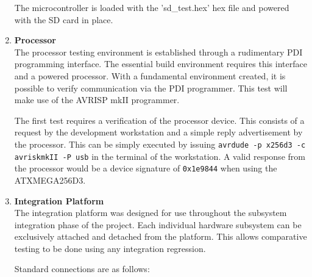 \documentclass[bibtotocnumbered,abstract=on,paper=a4,fontsize=12pt,parskip=on,halfparskip=on]{scrartcl}		%
\begin{document}
\begin{enumerate}
    The microcontroller is loaded with the 'sd\_test.hex' hex file and powered with the SD card in place.
    \item{\textbf{Processor}}\hfill \\
    The processor testing environment is established through a rudimentary PDI programming interface. The essential build environment requires this interface and a powered processor. With a fundamental environment created, it is possible to verify communication via the PDI programmer. This test will make use of the AVRISP mkII programmer.

      The first test requires a verification of the processor device. This consists of a request by the development workstation and a simple reply advertisement by the processor. This can be simply executed by issuing \texttt{avrdude -p x256d3 -c avriskmkII -P usb} in the terminal of the workstation. A valid response from the processor would be a device signature of \texttt{0x1e9844} when using the ATXMEGA256D3.
      \label{processortest}

    \item{\textbf{Integration Platform}}\hfill \\
      The integration platform was designed for use throughout the subsystem integration phase of the project. Each individual hardware subsystem can be exclusively attached and detached from the platform. This allows comparative testing to be done using any integration regression.

      Standard connections are as follows:


\end{enumerate}
\end{document}
